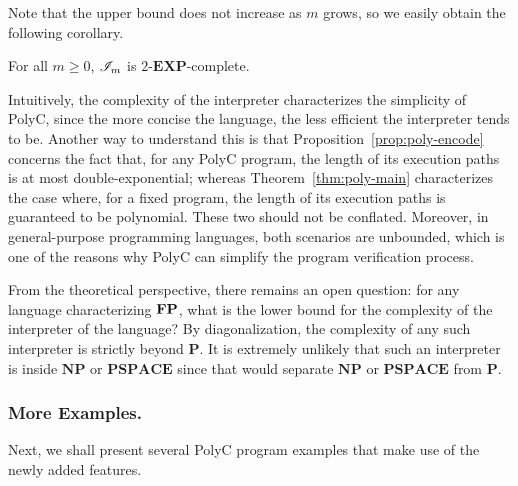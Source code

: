 \documentclass[runningheads]{llncs}
\begin{document}
Note that the upper bound does not increase as $m$ grows, so we easily obtain the following corollary.
\begin{corollary}
For all $m\ge0$, $\mathscr{I}_m$ is $2$-$\mathbf{EXP}$-complete.
\end{corollary}

Intuitively, the complexity of the interpreter characterizes the simplicity of PolyC, since the more concise the language, the less efficient the interpreter tends to be.
Another way to understand this is that Proposition~\ref{prop:poly-encode} concerns the fact that, for any PolyC program, the length of its execution paths is at most double-exponential; whereas Theorem~\ref{thm:poly-main} characterizes the case where, for a fixed program, the length of its execution paths is guaranteed to be polynomial. 
These two should not be conflated. 
Moreover, in general-purpose programming languages, both scenarios are unbounded, which is one of the reasons why PolyC can simplify the program verification process.

From the theoretical perspective, there remains an open question: for any language characterizing $\mathbf{FP}$, what is the lower bound for the complexity of the interpreter of the language?
By diagonalization, the complexity of any such interpreter is strictly beyond $\mathbf{P}$.
It is extremely unlikely that such an interpreter is inside $\mathbf{NP}$ or $\mathbf{PSPACE}$ since that would separate $\mathbf{NP}$ or $\mathbf{PSPACE}$ from $\mathbf{P}$.

\subsubsection{More Examples.} 
Next, we shall present several PolyC program examples that make use of the newly added features.
\end{document}
